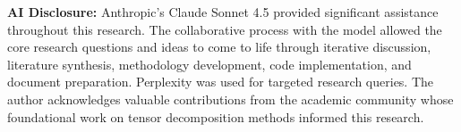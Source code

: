 \documentclass{article}
\begin{document}
\textbf{AI Disclosure:} Anthropic's Claude Sonnet 4.5 provided significant assistance throughout this research. The collaborative process with the model allowed the core research questions and ideas to come to life through iterative discussion, literature synthesis, methodology development, code implementation, and document preparation. Perplexity was used for targeted research queries. The author acknowledges valuable contributions from the academic community whose foundational work on tensor decomposition methods informed this research.

\clearpage
\onecolumn
{}  %


\end{document}
